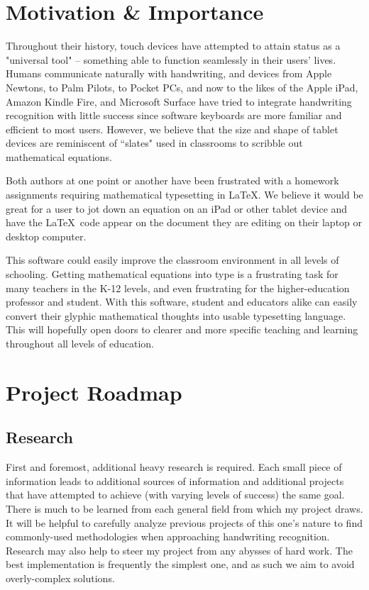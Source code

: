 \documentclass{acm_proc_article-sp}
\begin{document}
\section{Motivation \& Importance}
Throughout their history, touch devices have attempted to attain status as a "universal tool" -- something able to function seamlessly in their users' lives. Humans communicate naturally with handwriting, and devices from Apple Newtons, to Palm Pilots, to Pocket PCs, and now to the likes of the Apple iPad, Amazon Kindle Fire, and Microsoft Surface have tried to integrate handwriting recognition with little success since software keyboards are more familiar and efficient to most users. However, we believe that the size and shape of tablet devices are reminiscent of ``slates" used in classrooms to scribble out mathematical equations.

Both authors at one point or another have been frustrated with a homework assignments requiring mathematical typesetting in \LaTeX.  We believe it would be great for a user to jot down an equation on an iPad or other tablet device and have the \LaTeX\ code appear on the document they are editing on their laptop or desktop computer.

This software could easily improve the classroom environment in all levels of schooling. Getting mathematical equations into type is a frustrating task for many teachers in the K-12 levels, and even frustrating for the higher-education professor and student. With this software, student and educators alike can easily convert their glyphic mathematical thoughts into usable typesetting language. This will hopefully open doors to clearer and more specific teaching and learning throughout all levels of education.

\section{Project Roadmap}

\subsection{Research}
First and foremost, additional heavy research is required. Each small piece of information leads to additional sources of information and additional projects that have attempted to achieve (with varying levels of success) the same goal. There is much to be learned from each general field from which my project draws. It will be helpful to carefully analyze previous projects of this one's nature to find commonly-used methodologies when approaching handwriting recognition. Research may also help to steer my project from any abysses of hard work. The best implementation is frequently the simplest one, and as such we aim to avoid overly-complex solutions.
\end{document}
